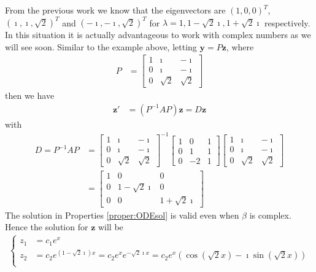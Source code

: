 \begin{solution}
From the previous work we know that the eigenvectors are $(1,0,0)^T$, $(\imath, \imath,\sqrt{2})^T$ and $(-\imath,-\imath,\sqrt{2})^T$ for $\lambda = 1, 1-\sqrt{2}\imath, 1+\sqrt{2}\imath$ respectively. In this situation it is actually advantageous to work with complex numbers as we will see soon. Similar to the example above, letting $\textbf{y} = P\textbf{z}$, where
\begin{align*}
P &=
\begin{bmatrix}
1 & \imath & -\imath \\
0 & \imath & -\imath \\
0 & \sqrt{2} & \sqrt{2} 
\end{bmatrix}
\end{align*}
then we have
\begin{align*}
\textbf{z}' &= (P^{-1}AP)\textbf{z} = D\textbf{z}
\end{align*}
with 
\begin{align*}
D = P^{-1}AP &= 
\begin{bmatrix}
1 & \imath & -\imath \\
0 & \imath & -\imath \\
0 & \sqrt{2} & \sqrt{2} 
\end{bmatrix}^{-1}
\begin{bmatrix}
1 & 0 & 1 \\
0 & 1 & 1 \\
0 & -2 & 1
\end{bmatrix}
\begin{bmatrix}
1 & \imath & -\imath \\
0 & \imath & -\imath \\
0 & \sqrt{2} & \sqrt{2} 
\end{bmatrix}
\\&=
\begin{bmatrix}
1 & 0 & 0 \\
0 & 1 - \sqrt{2}\imath & 0 \\
0 & 0 & 1 + \sqrt{2}\imath
\end{bmatrix}
\end{align*}
The solution in Properties \ref{proper:ODEsol} is valid even when $\beta$ is complex. Hence the solution for $\textbf{z}$ will be
\begin{align*}
\begin{cases}
z_1 &= c_1e^x \\
z_2 &= c_2e^{(1-\sqrt{2}\imath)x} = c_2e^{x}e^{-\sqrt{2}\imath x} = c_2e^{x}(\cos(\sqrt{2}x) - \imath\sin(\sqrt{2}x))\\

\end{cases}
\end{align*}
\end{solution}
